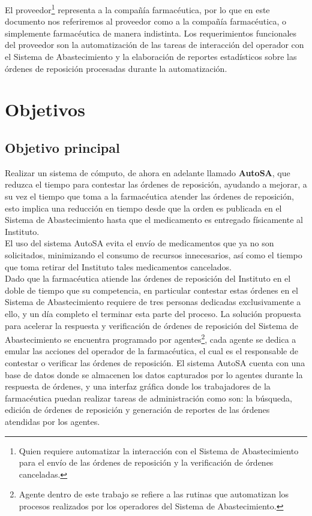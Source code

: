 El proveedor\footnote{Quien requiere automatizar la interacción con el Sistema de Abastecimiento para el envío de las órdenes de reposición y la verificación de órdenes canceladas.} representa a la compañía farmacéutica, por lo que en este documento nos referiremos al proveedor como a la compañía farmacéutica, o simplemente farmacéutica de manera indistinta. Los requerimientos funcionales del proveedor son la automatización de las tareas de interacción del operador con el Sistema de Abastecimiento y la elaboración de reportes estadísticos sobre las órdenes de reposición procesadas durante la automatización.

\section{Objetivos}
\subsection{Objetivo principal}\label{sec:objetivo-principal}
Realizar un sistema de cómputo, de ahora en adelante llamado \textbf{AutoSA}, que reduzca el tiempo para contestar las órdenes de reposición, ayudando a mejorar, a su vez el tiempo que toma a la farmacéutica atender las órdenes de reposición, esto implica una reducción en tiempo desde que la orden es publicada en el Sistema de Abastecimiento hasta que el medicamento es entregado físicamente al Instituto.\\
El uso del sistema AutoSA evita el envío de medicamentos que ya no son solicitados, minimizando el consumo de recursos innecesarios, así como el tiempo que toma retirar del Instituto tales medicamentos cancelados.\\
Dado que la farmacéutica atiende las órdenes de reposición del Instituto en el doble de tiempo que su competencia, en particular contestar estas órdenes en el Sistema de Abastecimiento requiere de tres personas dedicadas exclusivamente a ello, y un día completo el terminar esta parte del proceso. La solución propuesta para acelerar la respuesta y verificación de órdenes de reposición del Sistema de Abastecimiento se encuentra programado por agentes\footnote{Agente dentro de este trabajo se refiere a las rutinas que automatizan los procesos realizados por los operadores del Sistema de Abastecimiento.}, cada agente se dedica a emular las acciones del operador de la farmacéutica, el cual es el responsable de contestar o verificar las órdenes de reposición. El sistema AutoSA cuenta con una base de datos donde se almacenen los datos capturados por lo agentes durante la respuesta de órdenes, y una interfaz gráfica donde los trabajadores de la farmacéutica puedan realizar tareas de administración como son: la búsqueda, edición de órdenes de reposición y generación de reportes de las órdenes atendidas por los agentes.
